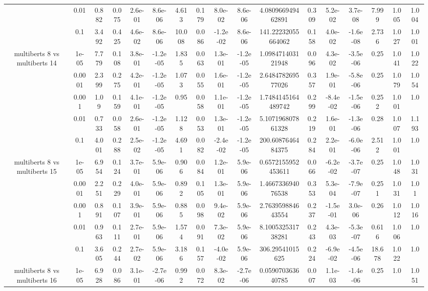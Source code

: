 \begin{tabular}{|c|c|c|c|c|c|c|c|c|c|c|c|c|c|c|c|c|}
 & 0.01 & 0.882 & 0.075 & 2.6e-01 & 8.6e-06 & 4.613 & 0.179 & 8.0e-02 & 8.6e-06 & 4.080966949462891 & 0.309 & 5.2e-02 & 3.7e-08 & 7.999 & 1.005 & 1.004 \\
 & 0.1 & 3.492 & 0.425 & 4.6e-02 & 8.6e-06 & 10.008 & 0.086 & -1.2e-02 & 8.6e-06 & 141.22232055664062 & 0.158 & 4.0e-02 & -1.6e-08 & 2.736 & 1.027 & 1.001 \\
\hline
\multirow{5}{*}{multiberts 8 vs multiberts 14} & 1e-05 & 7.779 & 0.108 & 3.8e-01 & -1.2e-05 & 1.835 & 0.063 & 1.3e-01 & -1.2e-05 & 1.098471403121948 & 0.096 & 4.3e-02 & -3.5e-06 & 0.25 & 1.041 & 1.022 \\
 & 0.0001 & 2.399 & 0.275 & 4.2e-01 & -1.2e-05 & 1.073 & 0.055 & 1.6e-01 & -1.2e-05 & 2.648478269577026 & 0.357 & 1.9e-01 & -5.8e-06 & 0.25 & 1.079 & 1.054 \\
 & 0.001 & 1.09 & 0.159 & 4.1e-01 & -1.2e-05 & 0.95 & 0.058 & 1.1e-01 & -1.2e-05 & 1.7484145164489742 & 0.299 & -8.4e-02 & -1.5e-06 & 0.252 & 1.001 & 1.0 \\
 & 0.01 & 0.733 & 0.058 & 2.6e-01 & -1.2e-05 & 1.128 & 0.053 & 1.3e-01 & -1.2e-05 & 5.107196807861328 & 0.219 & 1.6e-01 & -1.3e-06 & 0.28 & 1.007 & 1.193 \\
 & 0.1 & 4.001 & 0.288 & 2.5e-02 & -1.2e-05 & 4.691 & 0.082 & -2.4e-02 & -1.2e-05 & 200.6087646484375 & 0.284 & 2.2e-01 & -6.0e-06 & 2.512 & 1.001 & 1.0 \\
\hline
\multirow{5}{*}{multiberts 8 vs multiberts 15} & 1e-05 & 6.954 & 0.124 & 3.7e-01 & 5.9e-06 & 0.906 & 0.084 & 1.2e-01 & 5.9e-06 & 0.6572155952453611 & 0.066 & -6.2e-02 & -3.7e-07 & 0.25 & 1.048 & 1.031 \\
 & 0.0001 & 2.251 & 0.229 & 4.0e-01 & 5.9e-06 & 0.892 & 0.105 & 1.3e-01 & 5.9e-06 & 1.466733694076538 & 0.353 & 5.3e-04 & -7.9e-07 & 0.251 & 1.031 & 1.01 \\
 & 0.001 & 0.891 & 0.107 & 3.9e-01 & 5.9e-06 & 0.885 & 0.098 & 9.4e-02 & 5.9e-06 & 2.763959884643554 & 0.237 & -1.5e-01 & 3.0e-06 & 0.26 & 1.012 & 1.016 \\
 & 0.01 & 0.963 & 0.111 & 2.7e-01 & 5.9e-06 & 1.574 & 0.091 & 7.3e-02 & 5.9e-06 & 8.100532531738281 & 0.243 & 4.3e-03 & -5.3e-07 & 0.616 & 1.006 & 1.0 \\
 & 0.1 & 3.605 & 0.244 & 2.7e-02 & 5.9e-06 & 3.186 & 0.157 & -4.0e-02 & 5.9e-06 & 306.29541015625 & 0.224 & -6.9e-02 & -4.5e-06 & 18.678 & 1.022 & 1.0 \\
\hline
\multirow{5}{*}{multiberts 8 vs multiberts 16} & 1e-05 & 6.928 & 0.086 & 3.1e-01 & -2.7e-06 & 0.992 & 0.072 & 8.3e-02 & -2.7e-06 & 0.059070363640785 & 0.007 & 1.1e-03 & -1.4e-06 & 0.25 & 1.0 & 1.051 \\

\end{tabular}
